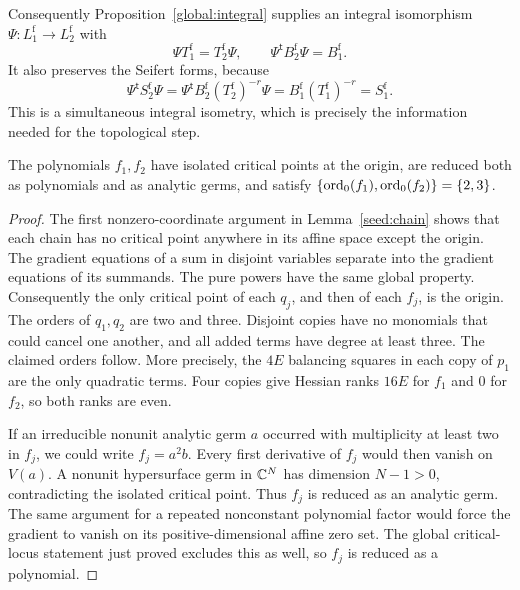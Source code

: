 Consequently Proposition~\ref{global:integral} supplies an integral
isomorphism $\Psi:L_1^{\mathrm f}\longrightarrow L_2^{\mathrm f}$ with
\[
 \Psi T_1^{\mathrm f}=T_2^{\mathrm f}\Psi,
 \qquad
 \Psi^{\mathsf t}B_2^{\mathrm f}\Psi=B_1^{\mathrm f}.
\]
It also preserves the Seifert forms, because
\begin{equation}
\label{topo:seifert}
 \Psi^{\mathsf t}S_2^{\mathrm f}\Psi
 =\Psi^{\mathsf t}B_2^{\mathrm f}(T_2^{\mathrm f})^{-r}\Psi
 =B_1^{\mathrm f}(T_1^{\mathrm f})^{-r}
 =S_1^{\mathrm f}.
\end{equation}
This is a simultaneous integral isometry, which is precisely the
information needed for the topological step.

\begin{lemma}
\label{topo:analytic}
The polynomials $f_1,f_2$ have isolated critical points at the origin,
are reduced both as polynomials and as analytic germs, and satisfy
$\{\operatorname{ord}_0(f_1),\operatorname{ord}_0(f_2)\}=\{2,3\}$.
\end{lemma}

\begin{proof}
The first nonzero-coordinate argument in Lemma~\ref{seed:chain}
shows that each chain has no critical point anywhere in its affine
space except the origin. The gradient equations of a sum in disjoint
variables separate into the gradient equations of its summands.
The pure powers have the same global property. Consequently the only
critical point of each $q_j$, and then of each $f_j$, is the origin.
The orders of $q_1,q_2$ are two and three.  Disjoint copies have no
monomials that could cancel one another, and all added terms have
degree at least three. The claimed orders follow. More precisely, the
$4E$ balancing squares in each copy of $p_1$ are the only quadratic
terms. Four copies give Hessian ranks $16E$ for $f_1$ and $0$ for
$f_2$, so both ranks are even.

If an irreducible nonunit analytic germ $a$ occurred with multiplicity
at least two in $f_j$, we could write $f_j=a^2b$.  Every first derivative
of $f_j$ would then vanish on $V(a)$.  A nonunit hypersurface germ in
$\mathbb C^N$ has dimension $N-1>0$, contradicting the isolated critical
point. Thus $f_j$ is reduced as an analytic germ. The same argument
for a repeated nonconstant polynomial factor would force the gradient
to vanish on its positive-dimensional affine zero set. The global
critical-locus statement just proved excludes this as well, so $f_j$
is reduced as a polynomial.
\end{proof}


